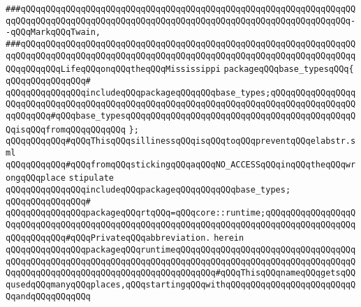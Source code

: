 \verb|###qQQqqQQqqQQqqQQqqQQqqQQqqQQqqQQqqQQqqQQqqQQqqQQqqQQqqQQqqQQqqQQqqQQqqQQqqQQqqQQqqQQqqQQqqQQqqQQqqQQqqQQqqQQqqQQqqQQqqQQqqQQqqQQqqQQqqQQq--qQQqMarkqQQqTwain,|\newline
\verb|###qQQqqQQqqQQqqQQqqQQqqQQqqQQqqQQqqQQqqQQqqQQqqQQqqQQqqQQqqQQqqQQqqQQqqQQqqQQqqQQqqQQqqQQqqQQqqQQqqQQqqQQqqQQqqQQqqQQqqQQqqQQqqQQqqQQqqQQqqQQqqQQqqQQqLifeqQQqonqQQqtheqQQqMississippi|\newline
\newline
\newline
\newline
\verb|packageqQQqbase_typesqQQq{|\newline
\verb|qQQqqQQqqQQqqQQq#|\newline
\verb|qQQqqQQqqQQqqQQqincludeqQQqpackageqQQqqQQqbase_types;qQQqqQQqqQQqqQQqqQQqqQQqqQQqqQQqqQQqqQQqqQQqqQQqqQQqqQQqqQQqqQQqqQQqqQQqqQQqqQQqqQQqqQQqqQQqqQQq#qQQqbase_typesqQQqqQQqqQQqqQQqqQQqqQQqqQQqqQQqqQQqqQQqqQQqqQQqisqQQqfromqQQqqQQqqQQq|\newline
\verb|};|\newline
\newline
\newline
\verb|qQQqqQQqqQQq#qQQqThisqQQqsillinessqQQqisqQQqtoqQQqpreventqQQqelabstr.sml|\newline
\verb|qQQqqQQqqQQq#qQQqfromqQQqstickingqQQqaqQQqNO_ACCESSqQQqinqQQqtheqQQqwrongqQQqplace|\newline
\newline
\verb|stipulate|\newline
\verb|qQQqqQQqqQQqqQQqincludeqQQqpackageqQQqqQQqqQQqbase_types;|\newline
\verb|qQQqqQQqqQQqqQQq#|\newline
\verb|qQQqqQQqqQQqqQQqpackageqQQqrtqQQq=qQQqcore::runtime;qQQqqQQqqQQqqQQqqQQqqQQqqQQqqQQqqQQqqQQqqQQqqQQqqQQqqQQqqQQqqQQqqQQqqQQqqQQqqQQqqQQqqQQqqQQqqQQqqQQq#qQQqPrivateqQQqabbreviation.|\newline
\verb|herein|\newline
\newline
\verb|qQQqqQQqqQQqqQQqpackageqQQqruntimeqQQqqQQqqQQqqQQqqQQqqQQqqQQqqQQqqQQqqQQqqQQqqQQqqQQqqQQqqQQqqQQqqQQqqQQqqQQqqQQqqQQqqQQqqQQqqQQqqQQqqQQqqQQqqQQqqQQqqQQqqQQqqQQqqQQqqQQqqQQqqQQqqQQq#qQQqThisqQQqnameqQQqgetsqQQqusedqQQqmanyqQQqplaces,qQQqstartingqQQqwithqQQqqQQqqQQqqQQq|\verb|qQQqqQQqqQQqandqQQqqQQqqQQq|\newline
